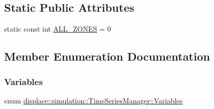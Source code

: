 \subsection*{Static Public Attributes}
\begin{DoxyCompactItemize}
\item 
static const int \mbox{\hyperlink{classdisplace_1_1simulation_1_1_time_series_manager_a06666b8659fd2756aa5fadecaa4f8354}{A\+L\+L\+\_\+\+Z\+O\+N\+ES}} = 0
\end{DoxyCompactItemize}


\subsection{Member Enumeration Documentation}
\mbox{\label{classdisplace_1_1simulation_1_1_time_series_manager_ae4e516e8c6ce2707d48ffafec4613ece}} 
\subsubsection{\texorpdfstring{Variables}{Variables}}
{\footnotesize\ttfamily enum \mbox{\hyperlink{classdisplace_1_1simulation_1_1_time_series_manager_ae4e516e8c6ce2707d48ffafec4613ece}{displace\+::simulation\+::\+Time\+Series\+Manager\+::\+Variables}}}

